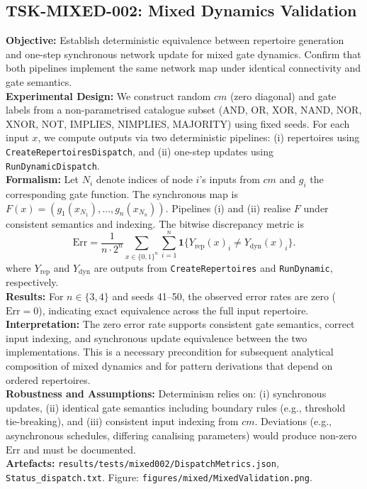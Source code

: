 \documentclass[11pt]{article}
\begin{document}
\subsection{TSK-MIXED-002: Mixed Dynamics Validation}
\textbf{Objective:} Establish deterministic equivalence between repertoire generation and one-step synchronous network update for mixed gate dynamics. Confirm that both pipelines implement the same network map under identical connectivity and gate semantics.\\
\textbf{Experimental Design:} We construct random \(cm\) (zero diagonal) and gate labels from a non-parametrised catalogue subset (AND, OR, XOR, NAND, NOR, XNOR, NOT, IMPLIES, NIMPLIES, MAJORITY) using fixed seeds. For each input \(x\), we compute outputs via two deterministic pipelines: (i) repertoires using \texttt{CreateRepertoiresDispatch}, and (ii) one-step updates using \texttt{RunDynamicDispatch}.\\
\textbf{Formalism:} Let \(N_i\) denote indices of node \(i\)'s inputs from \(cm\) and \(g_i\) the corresponding gate function. The synchronous map is \(F(x) = (g_1(x_{N_1}),\dots,g_n(x_{N_n}))\). Pipelines (i) and (ii) realise \(F\) under consistent semantics and indexing. The bitwise discrepancy metric is
\begin{equation*}
\mathrm{Err} = \frac{1}{n\cdot 2^n} \sum_{x \in \{0,1\}^n} \sum_{i=1}^n \mathbf{1}\big\{Y_{\mathrm{rep}}(x)_i \neq Y_{\mathrm{dyn}}(x)_i\big\}.
\end{equation*}
where \(Y_{\mathrm{rep}}\) and \(Y_{\mathrm{dyn}}\) are outputs from \texttt{CreateRepertoires} and \texttt{RunDynamic}, respectively.\\
\textbf{Results:} For \(n\in\{3,4\}\) and seeds 41–50, the observed error rates are zero (\(\mathrm{Err}=0\)), indicating exact equivalence across the full input repertoire.\\
\textbf{Interpretation:} The zero error rate supports consistent gate semantics, correct input indexing, and synchronous update equivalence between the two implementations. This is a necessary precondition for subsequent analytical composition of mixed dynamics and for pattern derivations that depend on ordered repertoires.\\
\textbf{Robustness and Assumptions:} Determinism relies on: (i) synchronous updates, (ii) identical gate semantics including boundary rules (e.g., threshold tie-breaking), and (iii) consistent input indexing from \(cm\). Deviations (e.g., asynchronous schedules, differing canalising parameters) would produce non-zero \(\mathrm{Err}\) and must be documented.\\
\textbf{Artefacts:} \texttt{results/tests/mixed002/DispatchMetrics.json}, \texttt{Status\_dispatch.txt}. Figure: \texttt{figures/mixed/MixedValidation.png}.\\
\end{document}
